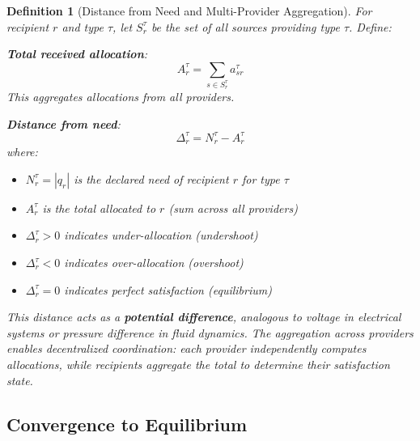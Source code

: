 \documentclass[11pt]{article}
\newtheorem{definition}{Definition}
\begin{document}
\begin{definition}[Distance from Need and Multi-Provider Aggregation]
For recipient $r$ and type $\tau$, let $S_r^\tau$ be the set of all sources providing type $\tau$. Define:

\textbf{Total received allocation}:
\[
A_r^\tau = \sum_{s \in S_r^\tau} a_{sr}^\tau
\]
This aggregates allocations from all providers.

\textbf{Distance from need}:
\[
\Delta_r^\tau = N_r^\tau - A_r^\tau
\]
where:
\begin{itemize}
\item $N_r^\tau = |q_r|$ is the declared need of recipient $r$ for type $\tau$
\item $A_r^\tau$ is the total allocated to $r$ (sum across all providers)
\item $\Delta_r^\tau > 0$ indicates under-allocation (undershoot)
\item $\Delta_r^\tau < 0$ indicates over-allocation (overshoot)
\item $\Delta_r^\tau = 0$ indicates perfect satisfaction (equilibrium)
\end{itemize}

This distance acts as a \textbf{potential difference}, analogous to voltage in electrical systems or pressure difference in fluid dynamics. The aggregation across providers enables decentralized coordination: each provider independently computes allocations, while recipients aggregate the total to determine their satisfaction state.
\end{definition}

\subsection{Convergence to Equilibrium}
\end{document}
